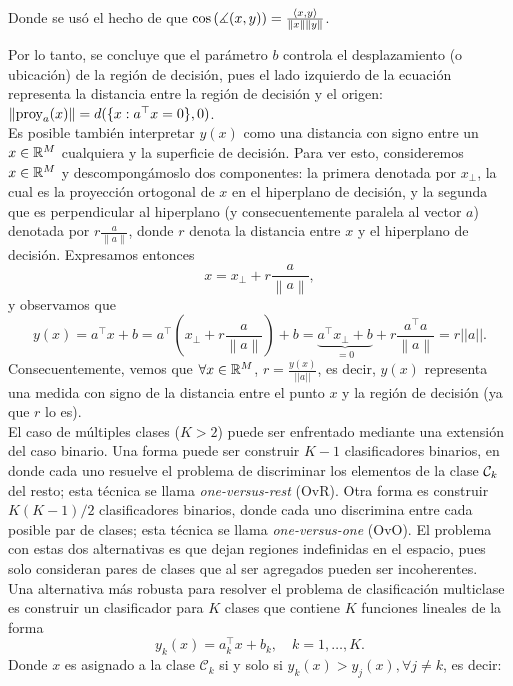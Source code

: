 Donde se usó el hecho de que $\cos\left(\measuredangle(x,y)\right) = \frac{\langle x,y\rangle}{\left\lVert x\right\rVert\left\lVert y\right\rVert}$.


Por lo tanto, se concluye que el parámetro $b$ controla el desplazamiento (o ubicación) de la región de decisión,  pues el lado izquierdo de la ecuación representa la distancia entre la región de decisión y el origen: $\left\lVert\text{proy}_a(x)\right\rVert = d(\{x:a^\top x = 0\},0)$.\\

Es posible  también interpretar $y(x)$ como una distancia con signo entre un $x\in\mathbb{R}^M$ cualquiera  y la superficie de decisión. Para ver esto, consideremos $x\in\mathbb{R}^M$ y descompongámoslo dos componentes: la primera denotada por $x_{\bot}$, la cual es la proyección ortogonal de $x$ en el hiperplano de  decisión, y la segunda que es perpendicular al hiperplano (y consecuentemente paralela al vector $a$) denotada por $r\frac{a}{\left \| a \right \|}$, donde $r$ denota la distancia entre $x$ y el  hiperplano de  decisión. Expresamos entonces  
\begin{equation}
	x = x_{\bot}+r\frac{a}{\left \| a \right \|},
\end{equation}
y observamos que
\begin{equation}
	y(x) 
	= a^\top x+b 
	=a^\top  \left( x_{\bot} + r\frac{a}{\left \| a \right \|} \right) +b 
	= \underbrace{a^\top x_{\bot} +b }_{=0} +   r\frac{a^\top  a}{\left \| a \right \|}
	= r||a||.
\end{equation}
Consecuentemente, vemos que $\forall x\in\mathbb{R}^M$, $r = \frac{y(x)}{||a||}$,  es decir, $y(x)$ representa una medida con signo de la  distancia entre el punto $x$ y la  región de decisión (ya que $r$ lo es).\\

El caso de múltiples clases ($K>2$) puede ser enfrentado mediante una extensión del caso binario. Una forma puede ser construir $K-1$ clasificadores binarios, en donde cada uno  resuelve el problema de discriminar los elementos de la  clase ${\mathcal C}_k$ del resto; esta técnica se llama \emph{one-versus-rest} (OvR). Otra forma es construir $K(K-1)/2$ clasificadores binarios, donde cada uno discrimina entre cada posible par de clases; esta técnica se llama \emph{one-versus-one} (OvO). El problema con estas dos alternativas es que dejan  regiones indefinidas en el espacio, pues solo consideran pares de clases que  al ser agregados pueden ser incoherentes. \\

Una alternativa más robusta para resolver el problema de clasificación multiclase es construir un clasificador para $K$ clases que contiene $K$ funciones lineales de la forma
\begin{equation}
	y_k(x) = a_k^\top x + b_k, \quad k=1,\ldots,K.
\end{equation}
Donde $x$ es asignado a la clase $\mathcal{C}_k$ si y solo si $y_k(x) > y_j(x), \forall j\neq k$, es decir:

